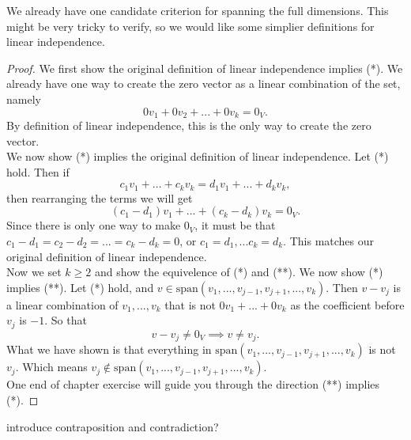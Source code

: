 We already have one candidate criterion for spanning the full dimensions.
This might be very tricky to verify, so we would like some simplier definitions for linear independence.
\begin{proof}%
	We first show the original definition of linear independence implies (*).
	We already have one way to create the zero vector as a linear combination of the set, namely\[
	0v_1+0v_2+...+0v_k=0_V.
	\] By definition of linear independence, this is the only way to create the zero vector.
	\\
	We now show (*) implies the original definition of linear independence. Let (*) hold. Then if \[
	c_1v_1+...+c_kv_k=d_1v_1+...+d_kv_k,
	\] then rearranging the terms we will get \[
		(c_1-d_1)v_1+...+(c_k-d_k)v_k = 0_V.
	\]
	Since there is only one way to make $0_V$, it must be that $c_1-d_1=c_2-d_2=...=c_k-d_k=0$, or $c_1=d_1,...c_k=d_k$. This matches our original definition of linear independence.
\\
	Now we set $k\geq 2$ and show the equivelence of (*) and (**).
	We now show (*) implies (**).  
	Let (*) hold, and $v\in\textrm{span}(v_1,...,v_{j-1},v_{j+1},...,v_{k})$.
	Then $v-v_j$ is a linear combination of $v_1,...,v_k$ that is not $0v_1+...+0v_k$ as the coefficient before $v_j$ is $-1$. So that \[
		v-v_j\neq 0_V \implies v\neq v_j.
	\]
	What we have shown is that everything in $\textrm{span}(v_1,...,v_{j-1},v_{j+1},...,v_{k})$ is not $v_j$. Which means $v_j\notin \textrm{span}(v_1,...,v_{j-1},v_{j+1},...,v_k)$.
	\\
	One end of chapter exercise will guide you through the direction (**) implies (*).
\end{proof}
\todo introduce contraposition and contradiction?

